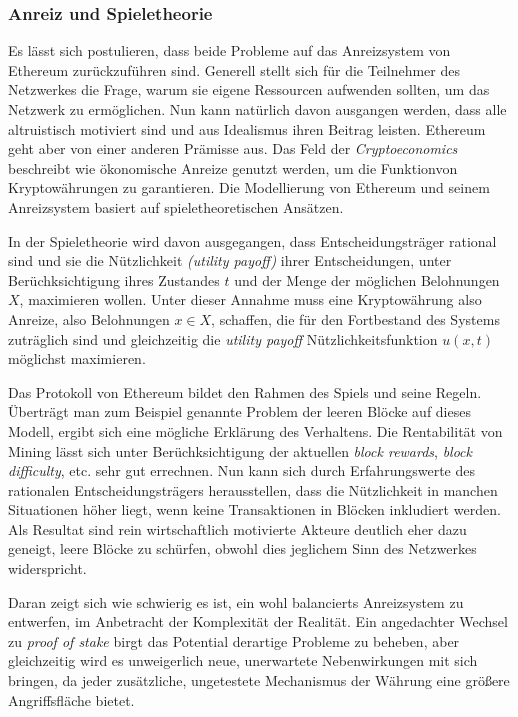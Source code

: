 \documentclass[runningheads]{llncs}
\begin{document}
\subsubsection{Anreiz und Spieletheorie}
Es lässt sich postulieren, dass beide Probleme auf das Anreizsystem von Ethereum zurückzuführen sind. Generell stellt sich für die Teilnehmer des Netzwerkes die Frage, warum sie eigene Ressourcen aufwenden sollten, um das Netzwerk zu ermöglichen. Nun kann natürlich davon ausgangen werden, dass alle altruistisch motiviert sind und aus Idealismus ihren Beitrag leisten. Ethereum geht aber von einer anderen Prämisse aus. Das Feld der \textit{Cryptoeconomics} beschreibt wie ökonomische Anreize genutzt werden, um die Funktionvon Kryptowährungen zu garantieren. Die Modellierung von Ethereum und seinem Anreizsystem basiert auf spieletheoretischen Ansätzen. \cite{noauthor_cryptoeconomics_nodate}

In der Spieletheorie wird davon ausgegangen, dass Entscheidungsträger rational sind und sie die Nützlichkeit \textit{(utility payoff)} ihrer Entscheidungen, unter Berüchksichtigung ihres Zustandes $ t $ und der Menge der möglichen Belohnungen $ X $,  maximieren wollen. Unter dieser Annahme muss eine Kryptowährung also Anreize, also Belohnungen $ x \in X $, schaffen, die für den Fortbestand des Systems zuträglich sind und gleichzeitig die \textit{utility payoff} Nützlichkeitsfunktion $ u(x, t) $ möglichst maximieren.  \cite[S. 2 ff.]{myerson_game_1997}

Das Protokoll von Ethereum bildet den Rahmen des Spiels und seine Regeln. Überträgt man zum Beispiel genannte Problem der leeren Blöcke auf dieses Modell, ergibt sich eine mögliche Erklärung des Verhaltens. Die Rentabilität von Mining lässt sich unter Berüchksichtigung der aktuellen \textit{block rewards}, \textit{block difficulty}, etc. sehr gut errechnen. \cite{noauthor_ethereum_nodate} Nun kann sich durch Erfahrungswerte des rationalen Entscheidungsträgers herausstellen, dass die Nützlichkeit in manchen Situationen höher liegt, wenn keine Transaktionen in Blöcken inkludiert werden. Als Resultat sind rein wirtschaftlich motivierte Akteure deutlich eher dazu geneigt, leere Blöcke zu schürfen, obwohl dies jeglichem Sinn des Netzwerkes widerspricht.

Daran zeigt sich wie schwierig es ist, ein wohl balancierts Anreizsystem zu entwerfen, im Anbetracht der Komplexität der Realität. Ein angedachter Wechsel zu \textit{proof of stake} birgt das Potential derartige Probleme zu beheben, aber gleichzeitig wird es unweigerlich neue, unerwartete Nebenwirkungen mit sich bringen, da jeder zusätzliche, ungetestete Mechanismus der Währung eine größere Angriffsfläche bietet. \cite{noauthor_ethereum/wiki_pos_nodate}
\end{document}
